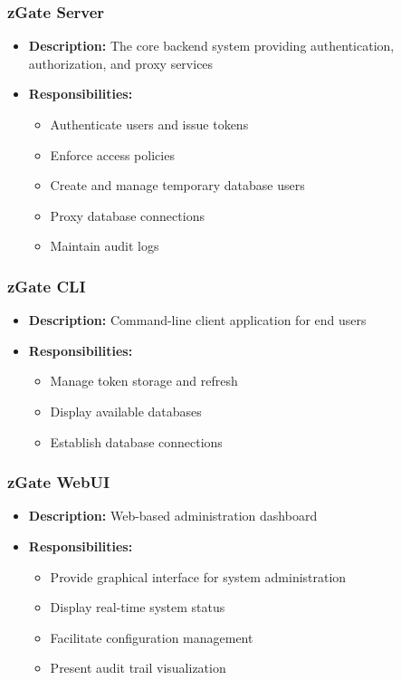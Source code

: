 \subsubsection{zGate Server}
\begin{itemize}
    \item \textbf{Description:} The core backend system providing authentication, authorization, and proxy services
    \item \textbf{Responsibilities:}
    \begin{itemize}
        \item Authenticate users and issue tokens
        \item Enforce access policies
        \item Create and manage temporary database users
        \item Proxy database connections
        \item Maintain audit logs
    \end{itemize}
\end{itemize}

\subsubsection{zGate CLI}
\begin{itemize}
    \item \textbf{Description:} Command-line client application for end users
    \item \textbf{Responsibilities:}
    \begin{itemize}
        \item Manage token storage and refresh
        \item Display available databases
        \item Establish database connections
    \end{itemize}
\end{itemize}

\subsubsection{zGate WebUI}
\begin{itemize}
    \item \textbf{Description:} Web-based administration dashboard
    \item \textbf{Responsibilities:}
    \begin{itemize}
        \item Provide graphical interface for system administration
        \item Display real-time system status
        \item Facilitate configuration management
        \item Present audit trail visualization
    \end{itemize}
\end{itemize}


